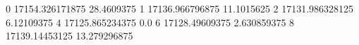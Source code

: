 0 17154.326171875 28.4609375
1 17136.966796875 11.1015625
2 17131.986328125 6.12109375
4 17125.865234375 0.0
6 17128.49609375 2.630859375
8 17139.14453125 13.279296875
